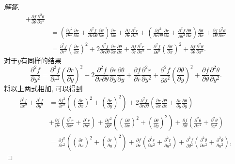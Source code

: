 \begin{3a}
\begin{enumerate}
\begin{proof}[解答]
\[\begin{aligned}
+\frac{\partial f}{\partial \theta}\frac{\partial^2\theta}{\partial x^2}\\
&=\left(\frac{\partial f^2}{\partial r^2}\frac{\partial r}{\partial x}
+\frac{\partial^2f}{\partial r\partial\theta}\frac{\partial\theta}{\partial x}\right)\frac{\partial r}{\partial x}
+\frac{\partial f}{\partial r}\frac{\partial^2r}{\partial x^2}
+\left(\frac{\partial f^2}{\partial r\partial\theta}\frac{\partial r}{\partial x}
+\frac{\partial^2f}{\partial\theta^2}\frac{\partial\theta}{\partial x}\right)\frac{\partial\theta}{\partial x}
+\frac{\partial f}{\partial\theta}\frac{\partial^2\theta}{\partial x^2}\\
&=\frac{\partial^2f}{\partial r^2}\left(\frac{\partial r}{\partial x}\right)^2
+2\frac{\partial^2f}{\partial r\partial\theta}\frac{\partial r}{\partial x}\frac{\partial\theta}{\partial x}
+\frac{\partial f}{\partial r}\frac{\partial^2r}{\partial x^2}
+\frac{\partial^2f}{\partial \theta^2}\left(\frac{\partial\theta}{\partial x}\right)^2
+\frac{\partial f}{\partial\theta}\frac{\partial^2\theta}{\partial x^2}.
\end{aligned}\]
对于\(y\)有同样的结果\[\frac{\partial^2f}{\partial y^2}
=\frac{\partial^2f}{\partial r^2}\left(\frac{\partial r}{\partial y}\right)^2
+2\frac{\partial^2f}{\partial r\partial\theta}\frac{\partial r}{\partial y}\frac{\partial\theta}{\partial y}
+\frac{\partial f}{\partial r}\frac{\partial^2r}{\partial y^2}
+\frac{\partial^2f}{\partial \theta^2}\left(\frac{\partial\theta}{\partial y}\right)^2
+\frac{\partial f}{\partial\theta}\frac{\partial^2\theta}{\partial y^2}.\]
将以上两式相加, 可以得到\[\begin{aligned}
\frac{\partial^2f}{\partial x^2}+\frac{\partial^2f}{\partial y^2}
&=\frac{\partial f^2}{\partial r^2}\left(\left(\frac{\partial r}{\partial x}\right)^2+\left(\frac{\partial r}{\partial y}\right)^2\right)+2\frac{\partial^2f}{\partial r\partial\theta}\left(\frac{\partial r}{\partial x}\frac{\partial\theta}{\partial x}+\frac{\partial r}{\partial y}\frac{\partial\theta}{\partial y}\right)\\
&+\frac{\partial f}{\partial r}\left(\frac{\partial^2r}{\partial x^2}+\frac{\partial^2r}{\partial y^2}\right)+\frac{\partial f^2}{\partial\theta^2}\left(\left(\frac{\partial\theta}{\partial x}\right)^2+\left(\frac{\partial\theta}{\partial y}\right)^2\right)+\frac{\partial f}{\partial\theta}\left(\frac{\partial^2\theta}{\partial x^2}+\frac{\partial^2\theta}{\partial y^2}\right)\\
&=\frac{\partial f^2}{\partial r^2}\left(\left(\frac{\partial r}{\partial x}\right)^2+\left(\frac{\partial r}{\partial y}\right)^2\right)+\frac{\partial f}{\partial r}\left(\frac{\partial^2r}{\partial x^2}+\frac{\partial^2r}{\partial y^2}\right)+\frac{\partial^2 f}{\partial\theta^2}\left(\frac{\partial^2\theta}{\partial x^2}+\frac{\partial^2\theta}{\partial y^2}\right),

\end{aligned}\]
\end{proof}
\end{enumerate}
\end{3a}
